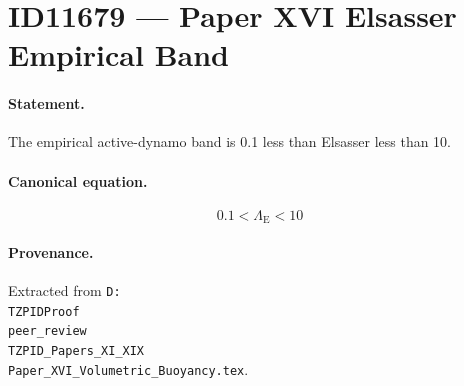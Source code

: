 \section*{ID11679 --- Paper XVI Elsasser Empirical Band}

\paragraph{Statement.}
The empirical active-dynamo band is 0.1 less than Elsasser less than 10.

\paragraph{Canonical equation.}
\[
0.1<\Lambda_{\mathrm{E}}<10
\]

\paragraph{Provenance.}
Extracted from \texttt{D:\\TZPIDProof\\peer\_review\\TZPID\_Papers\_XI\_XIX\\Paper\_XVI\_Volumetric\_Buoyancy.tex}.
